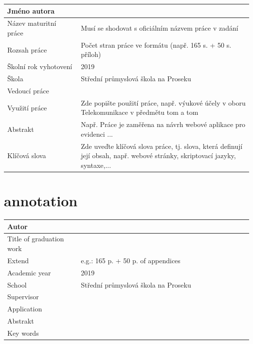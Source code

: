 \documentclass[12pt,a4paper]{article} %
\begin{document}
\begin{table}[htb]

	\begin{tabular}{|p{0.3\linewidth}|p{0.8\linewidth}|} \hline
	Jméno autora          & \\ \hline
	Název maturitní práce & {\color{red} Musí se shodovat s oficiálním názvem práce v zadání}										\\ \hline
	Rozsah práce          & {\color{red} Počet stran práce ve formátu (např. 165 s. + 50 s. příloh)}									\\ \hline
	Školní rok vyhotovení & 2019 \\ \hline
	Škola                 & Střední průmyslová škola na Proseku \\ \hline
	Vedoucí práce         & \\ \hline
	Využití práce         & {\color{red} Zde popište použití práce, např. výukové účely v oboru Telekomunikace v předmětu tom a tom}					\\ \hline
	Abstrakt              & {\color{red} Např. Práce je zaměřena na návrh webové aplikace pro evidenci ...} \\ \hline
	Klíčová slova         & {\color{red} Zde uveďte klíčová slova práce, tj. slova, která definují její obsah, např. webové stránky, skriptovací jazyky, syntaxe,...} \\ \hline
	\end{tabular}
\end{table}
\newpage
\section*{annotation}

\begin{table}[htb]
	\begin{tabular}{|p{0.3\linewidth}|p{0.8\linewidth}|} \hline
	Autor                    &							\\ \hline
	Title of graduation work &							\\ \hline
	Extend                   & {\color{red} e.g.: 165 p. + 50 p. of appendices}	\\ \hline
	Academic year            & 2019							\\ \hline
	School                   & Střední průmyslová škola na Proseku			\\ \hline
	Supervisor               &							\\ \hline
	Application              &							\\ \hline
	Abstrakt                 &							\\ \hline
	Key words                &                          \\ \hline 
	\end{tabular}
\end{table}
\end{document}
